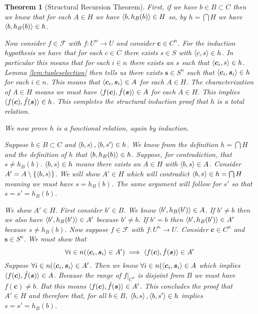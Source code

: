 \documentclass[12pt]{article}
\theoremstyle{break}
\theoremstyle{break}
\newtheorem{theorem}{Theorem}[section]
\theoremstyle{break}
\theoremstyle{break}
\theoremstyle{break}
\newtheorem{informal definition}[definition]{Informal Definition}
\newcommand{\bv}[1]{\boldsymbol{#1}}
\begin{document}
\begin{theorem}[Structural Recursion Theorem]
First, if we have $b \in B \subset C$ then we know that for each $A \in H$ we have $\braket{b, h_B(b)}\in H$ so, by $h = \bigcap H$ we have $\Braket{b, h_B(b)} \in h$.

Now consider $f\in \mathcal{F}$ with $f:U^n \to U$ and consider $\bv{c} \in C^n$.
For the induction hypothesis we have that for each $c\in C$ there exists $s\in S$ with $\braket{c, s} \in h$.
In particular this means that for each $i \in n$ there exists an $s$ such that $\braket{\bv{c}_i, s} \in h$.
Lemma \ref{lem:tupleselection} then tells us there exists $\bv{s}\in S^n$ such that $\braket{\bv{c}_i, \bv{s}_i} \in h$ for each $i\in n$.
This means that $\braket{\bv{c}_i, \bv{s}_i} \in A$ for each $A \in H$.
The characterization of $A \in H$ means we must have $\braket{f(\bv{c}), \tilde{f}(\bv{s})} \in A$ for each $A \in H$.
This implies $\braket{f(\bv{c}), \tilde{f}(\bv{s})}\in h$.
This completes the structural induction proof that $h$ is a total relation.

We now prove $h$ is a functional relation, again by induction.

Suppose $b\in B \subset C$ and $\braket{b, s}, \braket{b, s'} \in h$.
We know from the definition $h = \bigcap H$ and the definition of $h$ that $\braket{b, h_B(b)} \in h$.
Suppose, for contradiction, that $s \not = h_B(b)$.
$\braket{b, s}\in h$ means there exists an $A\in H$ with $\braket{b, s}\in A$.
Consider $A' = A \setminus\{\braket{b, s}\}$.
We will show $A'\in H$ which will contradict $\braket{b, s} \in h = \bigcap H$ meaning we must have $s = h_B(b)$.
The same argument will follow for $s'$ so that $s=s' = h_B(b)$.

We show $A' \in H$.
First consider $b'\in B$.
We know $\braket{b', h_B(b')} \in A$.
If $b' \not = b$ then we also have $\braket{b', h_B(b')} \in A'$ because $b' \not = b$.
If $b' = b$ then $\braket{b', h_B(b')} \in A'$ because $s \not = h_B(b)$.
Now suppose $f\in \mathcal{F}$ with $f:U^n \to U$.
Consider $\bv{c} \in C^n$ and $\bv{s} \in S^n$.
We must show that
$$
\forall i \in n(\braket{\bv{c}_i, \bv{s}_i} \in A') \implies \braket{f(\bv{c}), \tilde{f}(\bv{s})} \in A'
$$
Suppose $\forall i \in n(\braket{\bv{c}_i, \bv{s}_i} \in A'$.
Then we know $\forall i \in n(\braket{\bv{c}_i, \bv{s}_i} \in A$ which implies $\braket{f(\bv{c}), \tilde{f}(\bv{s})}\in A$.
Because the range of $f|_{C^n}$ is disjoint from $B$ we must have $f(\bv{c}) \not= b$.
But this means $\braket{f(\bv{c}), \tilde{f}(\bv{s})} \in A'$.
This concludes the proof that $A' \in H$ and therefore that, for all $b\in B$, $\braket{b, s}, \braket{b, s'}\in h$ implies $s=s'=h_B(b)$.


\end{theorem}
\end{document}
